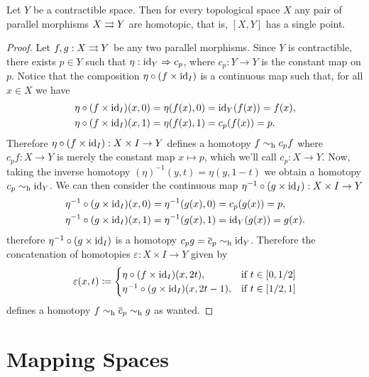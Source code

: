 \begin{corollary}
\label{cor:contractible-then-maps-to-space-are-homotopic}
Let \(Y\) be a contractible space. Then for every topological space \(X\) any
pair of parallel morphisms \(X \rightrightarrows Y\) are homotopic, that is, \([X, Y]\) has
a single point.
\end{corollary}

\begin{proof}
Let \(f, g: X \rightrightarrows Y\) be any two parallel morphisms. Since \(Y\) is
contractible, there exists \(p \in Y\) such that \(\eta: \operatorname{id}_Y \Rightarrow c_p\), where
\(c_p: Y \to Y\) is the constant map on \(p\). Notice that the composition
\(\eta \circ (f \times \operatorname{id}_I)\) is a continuous map such that, for all
\(x \in X\) we have
\begin{align*}
\eta \circ (f \times \operatorname{id}_I)(x, 0) &= \eta(f(x), 0) = \operatorname{id}_Y(f(x)) = f(x), \\
\eta \circ (f \times \operatorname{id}_I)(x, 1) &= \eta(f(x), 1) = c_p(f(x)) = p.
\end{align*}
Therefore \(\eta \circ (f \times \operatorname{id}_I): X \times I \to Y\) defines a homotopy
\(f \sim_{\text{h}} c_p f\) where \(c_p f: X \to Y\) is merely the constant map
\(x \mapsto p\), which we'll call \(\overline{c}_p: X \to Y\). Now, taking the
inverse homotopy \((\eta)^{-1}(y, t) = \eta(y, 1 - t)\) we obtain a homotopy
\(c_p \sim_{\text{h}} \operatorname{id}_Y\). We can then consider the continuous map
\(\eta^{-1} \circ (g \times \operatorname{id}_I): X \times I \to Y\)
\begin{align*}
\eta^{-1} \circ (g \times \operatorname{id}_I)(x, 0) &= \eta^{-1}(g(x), 0) = c_p(g(x)) = p, \\
\eta^{-1} \circ (g \times \operatorname{id}_I)(x, 1) &= \eta^{-1}(g(x), 1) = \operatorname{id}_Y(g(x)) = g(x).
\end{align*}
therefore \(\eta^{-1} \circ (g \times \operatorname{id}_I)\) is a homotopy \(c_p g =
\overline{c}_p \sim_{\text{h}} \operatorname{id}_Y\). Therefore the concatenation of homotopies
\(\varepsilon: X \times I \to Y\) given by
\[
\varepsilon(x, t) \coloneq
\begin{cases}
  \eta \circ (f \times \operatorname{id}_I)(x, 2 t), &\text{if } t \in [0, 1/2] \\
  \eta^{-1} \circ (g \times \operatorname{id}_I)(x, 2 t - 1), &\text{if } t \in [1/2, 1]
\end{cases}
\]
defines a homotopy \(f \sim_{\text{h}} \overline{c}_p \sim_{\text{h}} g\) as wanted.
\end{proof}

\section{Mapping Spaces}

